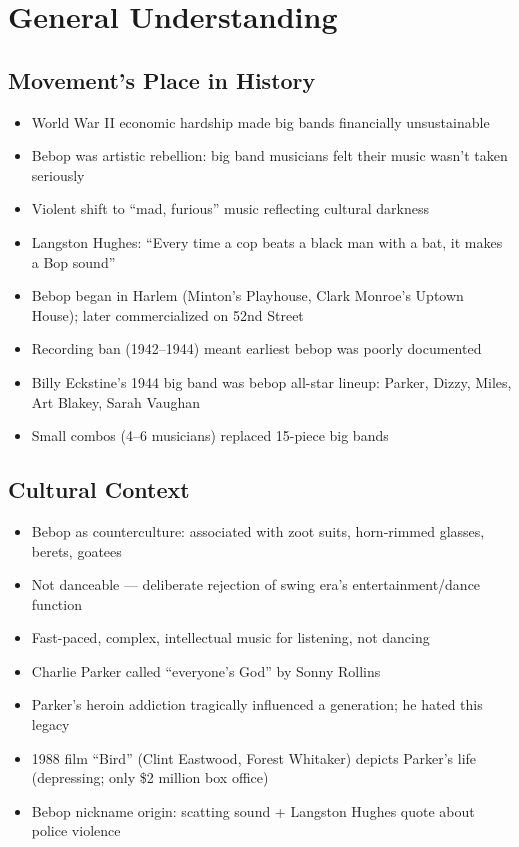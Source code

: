 \documentclass[11pt, letterpaper]{article}
\begin{document}
\section{General Understanding}

\subsection{Movement's Place in History}
\begin{itemize}
    \item World War II economic hardship made big bands financially unsustainable
    \item Bebop was artistic rebellion: big band musicians felt their music wasn't taken seriously
    \item Violent shift to ``mad, furious'' music reflecting cultural darkness
    \item Langston Hughes: ``Every time a cop beats a black man with a bat, it makes a Bop sound''
    \item Bebop began in Harlem (Minton's Playhouse, Clark Monroe's Uptown House); later commercialized on 52nd Street
    \item Recording ban (1942--1944) meant earliest bebop was poorly documented
    \item Billy Eckstine's 1944 big band was bebop all-star lineup: Parker, Dizzy, Miles, Art Blakey, Sarah Vaughan
    \item Small combos (4--6 musicians) replaced 15-piece big bands
\end{itemize}

\subsection{Cultural Context}
\begin{itemize}
    \item Bebop as counterculture: associated with zoot suits, horn-rimmed glasses, berets, goatees
    \item Not danceable --- deliberate rejection of swing era's entertainment/dance function
    \item Fast-paced, complex, intellectual music for listening, not dancing
    \item Charlie Parker called ``everyone's God'' by Sonny Rollins
    \item Parker's heroin addiction tragically influenced a generation; he hated this legacy
    \item 1988 film ``Bird'' (Clint Eastwood, Forest Whitaker) depicts Parker's life (depressing; only \$2 million box office)
    \item Bebop nickname origin: scatting sound + Langston Hughes quote about police violence
\end{itemize}
\end{document}
